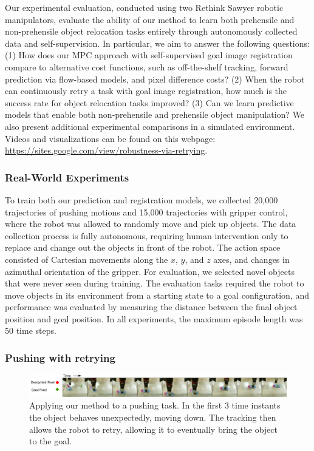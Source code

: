 Our experimental evaluation, conducted using two Rethink Sawyer robotic manipulators, evaluate the ability of our method to learn both prehensile and non-prehensile object relocation tasks entirely through autonomously collected data and self-supervision. In particular, we aim to answer the following questions: (1) How does our MPC approach with self-supervised goal image registration compare to alternative cost functions, such as off-the-shelf tracking, forward prediction via flow-based models, and pixel difference costs? (2) When the robot can continuously retry a task with goal image registration, how much is the success rate for object relocation tasks improved? (3) Can we learn predictive models that enable both non-prehensile and prehensile object manipulation? We also present additional experimental comparisons in a simulated environment.
Videos and visualizations can be found on this webpage: \url{https://sites.google.com/view/robustness-via-retrying}.

\subsubsection{Real-World Experiments}



To train both our prediction and registration models, we collected 20,000 trajectories of pushing motions and 15,000 trajectories with gripper control, where the robot was allowed to randomly move and pick up objects. The data collection process is fully autonomous, requiring human intervention only to replace and change out the objects in front of the robot.
The action space consisted of Cartesian movements along the $x$, $y$, and $z$ axes, and changes in azimuthal orientation of the gripper. For evaluation, we selected novel objects that were never seen during training. The evaluation tasks required the robot to move objects in its environment from a starting state to a goal configuration, and performance was evaluated by measuring the distance between the final object position and goal position. In all experiments, the maximum episode length was 50 time steps.



\subsubsection{Pushing with retrying}
\begin{figure}
    \centering
    \includegraphics[width=1.0\textwidth]{images_rfr/push_correction.pdf}
    \caption{\small{Applying our method to a pushing task. In the first 3 time instants the object behaves unexpectedly, moving down. The tracking then allows the robot to retry, allowing it to eventually bring the object to the goal.}}
    \label{fig:push_retry}
\end{figure}

